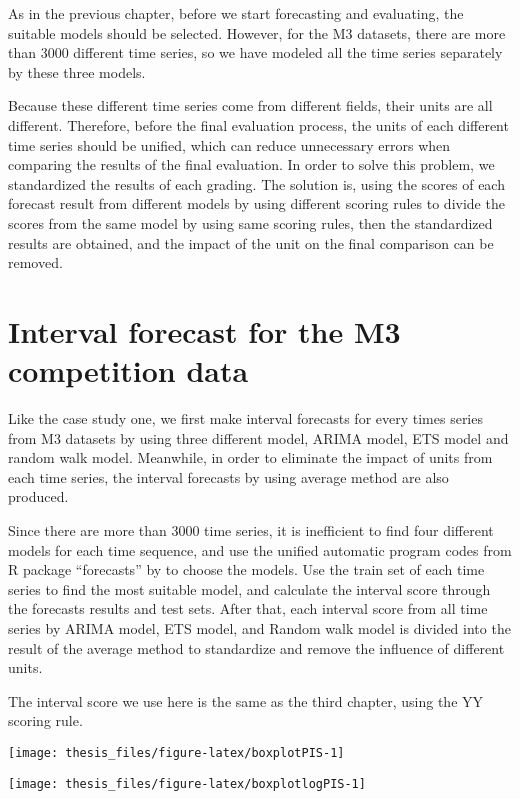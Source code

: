 \documentclass{monashthesis}
\theoremstyle{definition}
\theoremstyle{definition}
\theoremstyle{definition}
\theoremstyle{remark}
\begin{document}
As in the previous chapter, before we start forecasting and evaluating,
the suitable models should be selected. However, for the M3 datasets,
there are more than 3000 different time series, so we have modeled all
the time series separately by these three models.

Because these different time series come from different fields, their
units are all different. Therefore, before the final evaluation process,
the units of each different time series should be unified, which can
reduce unnecessary errors when comparing the results of the final
evaluation. In order to solve this problem, we standardized the results
of each grading. The solution is, using the scores of each forecast
result from different models by using different scoring rules to divide
the scores from the same model by using same scoring rules, then the
standardized results are obtained, and the impact of the unit on the
final comparison can be removed.

\section{Interval forecast for the M3 competition
data}\label{interval-forecast-for-the-m3-competition-data}

Like the case study one, we first make interval forecasts for every
times series from M3 datasets by using three different model, ARIMA
model, ETS model and random walk model. Meanwhile, in order to eliminate
the impact of units from each time series, the interval forecasts by
using average method are also produced.

Since there are more than 3000 time series, it is inefficient to find
four different models for each time sequence, and use the unified
automatic program codes from R package ``forecasts'' by \textcite{RH181}
to choose the models. Use the train set of each time series to find the
most suitable model, and calculate the interval score through the
forecasts results and test sets. After that, each interval score from
all time series by ARIMA model, ETS model, and Random walk model is
divided into the result of the average method to standardize and remove
the influence of different units.

The interval score we use here is the same as the third chapter, using
the YY scoring rule.

\texttt{[image: thesis\_files/figure-latex/boxplotPIS-1]}

\texttt{[image: thesis\_files/figure-latex/boxplotlogPIS-1]}
\end{document}
